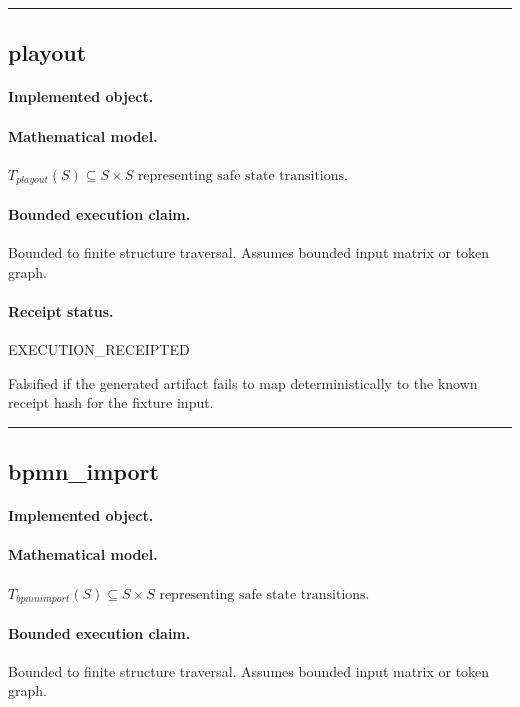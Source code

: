 \vspace{1em}\hrule\vspace{1em}
\subsection{playout}
\paragraph{Implemented object.} 
\paragraph{Mathematical model.} $T_{playout}(S) \subseteq S \times S \text{ representing safe state transitions}.$
\paragraph{Bounded execution claim.} Bounded to finite structure traversal. Assumes bounded input matrix or token graph.
\paragraph{Receipt status.} EXECUTION\_RECEIPTED
\begin{falsifier}
Falsified if the generated artifact fails to map deterministically to the known receipt hash for the fixture input.
\end{falsifier}

\vspace{1em}\hrule\vspace{1em}
\subsection{bpmn\_import}
\paragraph{Implemented object.} 
\paragraph{Mathematical model.} $T_{bpmnimport}(S) \subseteq S \times S \text{ representing safe state transitions}.$
\paragraph{Bounded execution claim.} Bounded to finite structure traversal. Assumes bounded input matrix or token graph.
